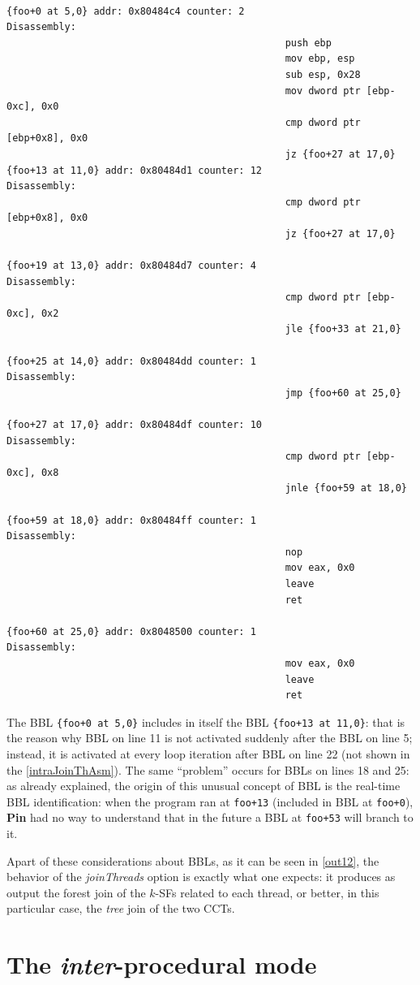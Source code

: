 \documentclass[a4paper,10pt]{report}
\begin{document}
\begin{lstlisting}[language={[x86masm]Assembler}, 
	label=intraJoinThAsm, caption={a part of ``all basic blocks'' table of \texttt{prog5}}]

{foo+0 at 5,0} addr: 0x80484c4 counter: 2   
Disassembly:
												push ebp
												mov ebp, esp
												sub esp, 0x28
												mov dword ptr [ebp-0xc], 0x0
												cmp dword ptr [ebp+0x8], 0x0
												jz {foo+27 at 17,0}
{foo+13 at 11,0} addr: 0x80484d1 counter: 12
Disassembly: 
												cmp dword ptr [ebp+0x8], 0x0
												jz {foo+27 at 17,0}

{foo+19 at 13,0} addr: 0x80484d7 counter: 4
Disassembly: 
												cmp dword ptr [ebp-0xc], 0x2
												jle {foo+33 at 21,0}

{foo+25 at 14,0} addr: 0x80484dd counter: 1
Disassembly: 
												jmp {foo+60 at 25,0}

{foo+27 at 17,0} addr: 0x80484df counter: 10
Disassembly: 
												cmp dword ptr [ebp-0xc], 0x8
												jnle {foo+59 at 18,0}

{foo+59 at 18,0} addr: 0x80484ff counter: 1
Disassembly: 
												nop 
												mov eax, 0x0
												leave 
												ret 

{foo+60 at 25,0} addr: 0x8048500 counter: 1 
Disassembly: 
												mov eax, 0x0
												leave 
												ret 

\end{lstlisting}

The BBL \verb|{foo+0 at 5,0}| includes in itself the BBL \verb|{foo+13 at 11,0}|: 
that is the reason why BBL on line 11 is not activated suddenly 
after the BBL on line 5; instead, it is activated at every loop iteration 
after BBL on line 22 (not shown in the \cref{intraJoinThAsm}). 
The same ``problem'' occurs for BBLs on lines 18 and 25: 
as already explained, the origin of this unusual concept of BBL is the real-time BBL 
identification: when the program ran at \verb|foo+13| (included in BBL at \verb|foo+0|),
\textbf{Pin} had no way to understand that in the future a BBL at \verb|foo+53| will 
branch to it.

Apart of these considerations about BBLs, as it can be seen in \cref{out12},
the behavior of the \emph{joinThreads} option is exactly what one expects: 
it produces as output the forest join of the $k$-SFs related to each thread, 
or better, in this particular case, the \emph{tree} join of the two CCTs.

\section{The \emph{inter}-procedural mode}
\end{document}
